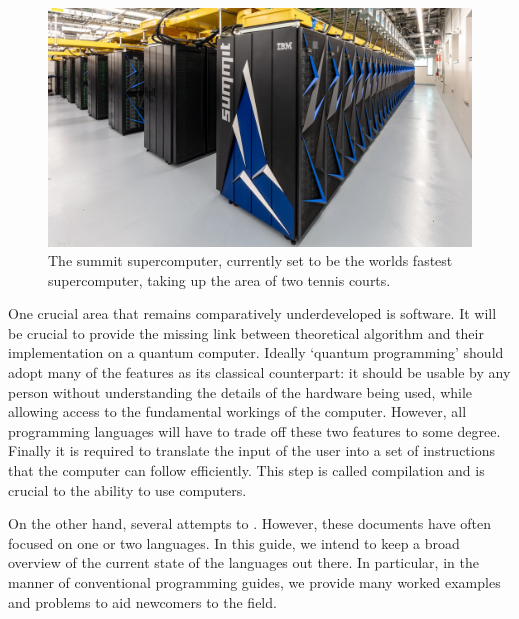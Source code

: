 \begin{figure}
    \centering
    \includegraphics[width=\linewidth]{figures/SummitSC.jpg}
    \caption{The summit supercomputer, currently set to be the worlds fastest supercomputer, taking up the area of two tennis courts. \cite{SummitSC}}
    \label{fig:Summit}
\end{figure}

One crucial area that remains comparatively underdeveloped is software. It will be crucial to provide the missing link between theoretical algorithm and their implementation on a quantum computer. Ideally `quantum programming' should adopt many of the features as its classical counterpart: it should be usable by any person without understanding the details of the hardware being used, while allowing access to the fundamental workings of the computer. However, all programming languages will have to trade off these two features to some degree. Finally it is required to translate the input of the user into a set of instructions that the computer can follow efficiently. This step is called compilation and is crucial to the ability to use computers.

On the other hand, several attempts to  \cite{AlamosIBM2018, Xanadu2018, DK2018, DKBlog, RL2018, JW2018}. However, these documents have often focused on one or two languages. In this guide, we intend to keep a broad overview of the current state of the languages out there. In particular, in the manner of conventional programming guides, we provide many worked examples and problems to aid newcomers to the field. 


